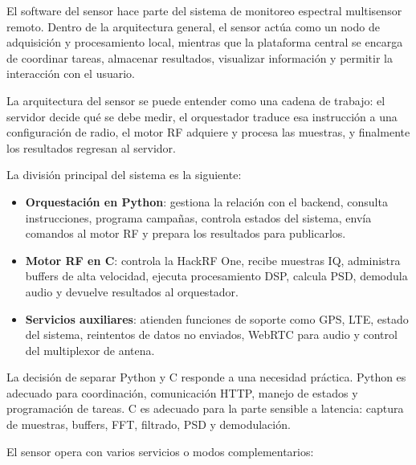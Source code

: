 El software del sensor hace parte del sistema de monitoreo espectral multisensor
remoto. Dentro de la arquitectura general, el sensor actúa como un nodo de
adquisición y procesamiento local, mientras que la plataforma central se encarga
de coordinar tareas, almacenar resultados, visualizar información y permitir la
interacción con el usuario.

La arquitectura del sensor se puede entender como una cadena de trabajo: el
servidor decide qué se debe medir, el orquestador traduce esa instrucción a una
configuración de radio, el motor RF adquiere y procesa las muestras, y finalmente
los resultados regresan al servidor.

La división principal del sistema es la siguiente:

\begin{itemize}
  \item \textbf{Orquestación en Python}: gestiona la relación con el backend,
  consulta instrucciones, programa campañas, controla estados del sistema, envía
  comandos al motor RF y prepara los resultados para publicarlos.

  \item \textbf{Motor RF en C}: controla la HackRF One, recibe muestras IQ,
  administra buffers de alta velocidad, ejecuta procesamiento DSP, calcula PSD,
  demodula audio y devuelve resultados al orquestador.

  \item \textbf{Servicios auxiliares}: atienden funciones de soporte como GPS,
  LTE, estado del sistema, reintentos de datos no enviados, WebRTC para audio y
  control del multiplexor de antena.
\end{itemize}

La decisión de separar Python y C responde a una necesidad práctica. Python es
adecuado para coordinación, comunicación HTTP, manejo de estados y programación
de tareas. C es adecuado para la parte sensible a latencia: captura de muestras,
buffers, FFT, filtrado, PSD y demodulación.

El sensor opera con varios servicios o modos complementarios:

